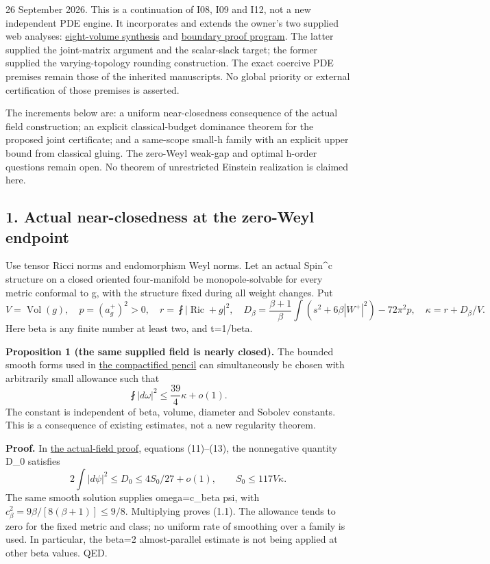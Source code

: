 \documentclass[
  10pt,
]{article}
\begin{document}
26 September 2026. This is a continuation of I08, I09 and I12, not a new
independent PDE engine. It incorporates and extends the owner's two
supplied web analyses:
\href{../guidance/source/20260926_web_eight_volume_synthesis.zh.md}{eight-volume
synthesis} and
\href{../guidance/source/20260926_web_boundary_proof_program.zh.md}{boundary
proof program}. The latter supplied the joint-matrix argument and the
scalar-slack target; the former supplied the varying-topology rounding
construction. The exact coercive PDE premises remain those of the
inherited manuscripts. No global priority or external certification of
those premises is asserted.

The increments below are: a uniform near-closedness consequence of the
actual field construction; an explicit classical-budget dominance
theorem for the proposed joint certificate; and a same-scope small-h
family with an explicit upper bound from classical gluing. The zero-Weyl
weak-gap and optimal h-order questions remain open. No theorem of
unrestricted Einstein realization is claimed here.

\hypertarget{actual-near-closedness-at-the-zero-weyl-endpoint}{%
\subsection{1. Actual near-closedness at the zero-Weyl
endpoint}\label{actual-near-closedness-at-the-zero-weyl-endpoint}}

Use tensor Ricci norms and endomorphism Weyl norms. Let an actual
Spin\^{}c structure on a closed oriented four-manifold be
monopole-solvable for every metric conformal to g, with the structure
fixed during all weight changes. Put \[
 V=\operatorname{Vol}(g),\quad p=(a_g^+)^2>0,\quad
 r=\fint|\operatorname{Ric}+g|^2,\quad
 D_\beta=\frac{\beta+1}{\beta}\int(s^2+6\beta|W^+|^2)-72\pi^2p,
 \quad \kappa=r+D_\beta/V.
\] Here beta is any finite number at least two, and t=1/beta.

\textbf{Proposition 1 (the same supplied field is nearly closed).} The
bounded smooth forms used in
\href{../mathematics/current/line1_compactified_pencil.md}{the
compactified pencil} can simultaneously be chosen with arbitrarily small
allowance such that \[
 \fint|d\omega|^2\le\frac{39}{4}\kappa+o(1).                 \tag{1.1}
\] The constant is independent of beta, volume, diameter and Sobolev
constants. This is a consequence of existing estimates, not a new
regularity theorem.

\textbf{Proof.} In
\href{../mathematics/current/line1_functional_pencil.md}{the
actual-field proof}, equations (11)--(13), the nonnegative quantity D\_0
satisfies \[
 2\int|d\psi|^2\le D_0\le4S_0/27+o(1),\qquad S_0\le117V\kappa.
\] The same smooth solution supplies omega=c\_beta psi, with
\(c_\beta^2=9\beta/[8(\beta+1)]\le9/8\). Multiplying proves (1.1). The
allowance tends to zero for the fixed metric and class; no uniform rate
of smoothing over a family is used. In particular, the beta=2
almost-parallel estimate is not being applied at other beta values. QED.
\end{document}
